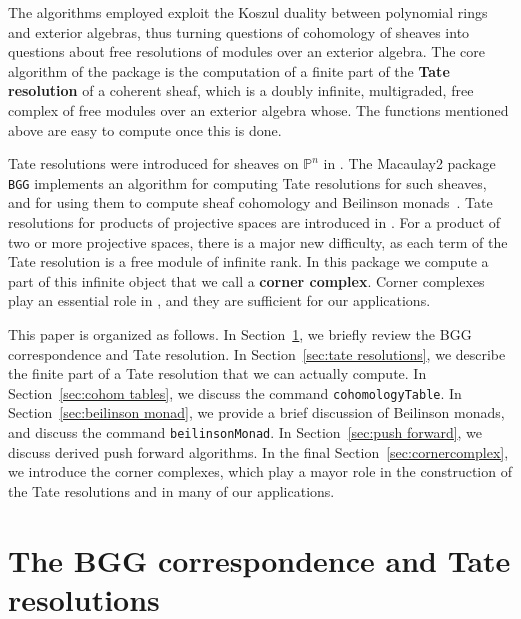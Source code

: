 \documentclass[twoside,12pt, leqno]{amsart}
\def\PP{{\mathbb P}}
\begin{document}
The algorithms employed exploit the Koszul duality between polynomial rings and exterior algebras, thus turning questions of cohomology of sheaves into questions about free resolutions of modules over an exterior algebra.  The core algorithm of the package is the computation of a finite part of the {\bf Tate resolution} of a coherent sheaf, which is a doubly infinite, multigraded, free complex of free modules over an exterior algebra whose.  The functions mentioned above are easy to compute once this is done.

Tate resolutions were introduced for sheaves on $\PP^n$ in \cite{EFS}.  The Macaulay2 package {\tt BGG} implements an algorithm for computing Tate resolutions for such sheaves, and for using them to compute sheaf cohomology and Beilinson monads~\cite{M2BGG}.  Tate resolutions for products of projective spaces are introduced in \cite{EES}.  
For a product of two or more projective spaces, there is a major new difficulty, as each term of the Tate resolution is a free module of infinite rank.  
In this package we compute a part of this infinite object that we call a {\bf corner complex}.  Corner complexes play an essential role in \cite{EES}, and they are sufficient for our applications.

This paper is organized as follows.  In Section~\ref{sec:background}, we briefly review the BGG correspondence and Tate resolution.  In Section~\ref{sec:tate resolutions}, we describe the finite part of a Tate resolution that we can actually compute.  In Section~\ref{sec:cohom tables}, we discuss the command {\tt cohomologyTable}.  
In Section~\ref{sec:beilinson monad}, we provide a brief discussion of Beilinson monads, and discuss the command {\tt beilinsonMonad}.  In Section~\ref{sec:push forward}, we discuss derived push forward algorithms. In the final Section~\ref{sec:cornercomplex}, we introduce the corner complexes, which play a mayor role in the construction of the Tate resolutions and in many of our applications.

\section{The BGG correspondence and Tate resolutions}\label{sec:background}

\end{document}
